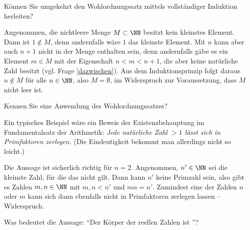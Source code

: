 \begin{frage}
  Können Sie umgekehrt den Wohlordnungssatz mittels  
  vollständiger Induktion herleiten?
\end{frage}

\begin{antwort}
  Angenommen, die nichtleere Menge $M\subset \NN$ 
  besitzt kein kleinstes Element. Dann 
  ist $1\not\in M$, denn andernfalls wäre $1$ das kleinste Element. 
  Mit $n$ kann aber auch $n+1$ nicht in der Menge enthalten sein, denn 
  andernfalls gäbe es ein Element $m\in M$ mit der Eigenschaft $n<m<n+1$, 
  die aber keine natürliche Zahl besitzt (vgl. Frage \ref{dazwischen}). 
  Aus dem Induktionsprinzip folgt daraus $n \not\in M$ für alle $n\in \NN$, 
  also $M=\emptyset$, im Widerspruch zur Voraussetzung, dass $M$ nicht leer ist.
  \AntEnd
\end{antwort}






\begin{frage}
  Kennen Sie eine Anwendung des Wohlordnungssatzes?
\end{frage}

\begin{antwort}
  Ein typisches Beispiel 
  wäre ein Beweis der Existenzbehauptung im 
  Fundamentalsatz der Arithmetik:  
  \textit{Jede natürliche Zahl $>1$ lässt sich 
    in Primfaktoren zerlegen.} (Die Eindeutigkeit bekommt man allerdings 
  nicht so leicht.) 

  Die Aussage ist sicherlich richtig für $n=2$. 
  Angenommen, $n'\in \NN$ sei die kleinste Zahl, für die das nicht gilt. 
  Dann kann $n'$ keine Primzahl sein, also gibt es Zahlen $m,n \in \NN$ mit 
  $m,n < n'$ und $mn=n'$. Zumindest eine der 
  Zahlen $n$ oder $m$ kann sich dann ebenfalls nicht in 
  Primfaktoren zerlegen lassen -- Widerspruch. 
  \AntEnd
\end{antwort}

\begin{frage}\label{01_archimedes}
  Was bedeutet die Aussage: "`Der Körper der reellen Zahlen ist 
  "'?
\end{frage}

